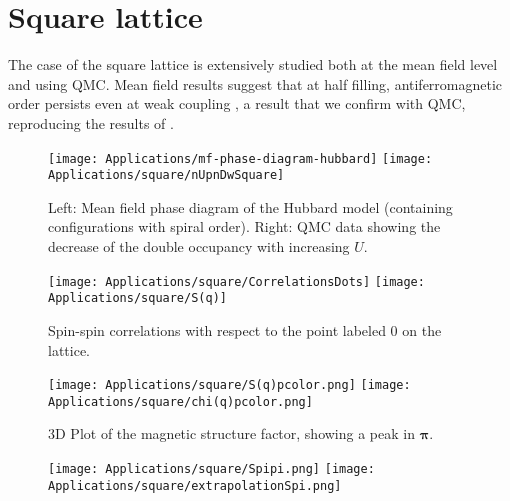 \section{Square lattice}
\label{sec:square}

The case of the square lattice is extensively studied both at the mean field level and using \acs{QMC}.
Mean field results suggest that at half filling,  antiferromagnetic order persists even at weak coupling \cite{claveau_mean-field_2014, gouveia_magnetic_2015}, a result that we confirm with \acs{QMC}, reproducing the results of \cite{white_numerical_1989, hirsch_two-dimensional_1985}.

\begin{figure}[H]
\label{fig:mfHubbardPhaseDiagram}
\hspace{-0.18cm}
\texttt{[image: Applications/mf-phase-diagram-hubbard]}
\texttt{[image: Applications/square/nUpnDwSquare]}
\caption[Mean field phase diagram of the Hubbard model. \ac{QMC} data showing the decrease of the double occupancy with increasing $U$.]{Left: Mean field phase diagram of the Hubbard model \cite{gouveia_magnetic_2015} (containing configurations with spiral order). Right: \ac{QMC} data showing the decrease of the double occupancy with increasing $U$.}
\end{figure}

\begin{figure}[H]\label{fig:corrSq}
\hspace{-0.3cm}
\texttt{[image: Applications/square/CorrelationsDots]}
\hspace{0.2cm}
\texttt{[image: Applications/square/S(q)]}
\caption[Spin-spin correlations with respect to the point labeled $0$ on the lattice.
3D Plot of the magnetic structure factor]{Spin-spin correlations with respect to the point labeled $0$ on the lattice.}
\end{figure}

\begin{figure}[H]\label{fig:corrSq}
\hspace{-0.2cm}
\texttt{[image: Applications/square/S(q)pcolor.png]}
\hspace{0.1cm}
\texttt{[image: Applications/square/chi(q)pcolor.png]}
\caption[3D Plot of the magnetic structure factor]{3D Plot of the magnetic structure factor, showing a peak in $\bm \pi$.}
\end{figure}

\begin{figure}[H]\label{fig:corrSq}
\hspace{-0.4cm}
\texttt{[image: Applications/square/Spipi.png]}
\texttt{[image: Applications/square/extrapolationSpi.png]}
\caption[]{}
\end{figure}